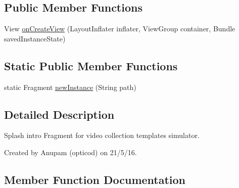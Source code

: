 \subsection*{Public Member Functions}
\begin{DoxyCompactItemize}
\item 
View \hyperlink{classorg_1_1buildmlearn_1_1toolkit_1_1videocollectiontemplate_1_1fragment_1_1SplashFragment_a0a73bd58faf388b47642aabf25cb2785}{on\+Create\+View} (Layout\+Inflater inflater, View\+Group container, Bundle saved\+Instance\+State)
\end{DoxyCompactItemize}
\subsection*{Static Public Member Functions}
\begin{DoxyCompactItemize}
\item 
static Fragment \hyperlink{classorg_1_1buildmlearn_1_1toolkit_1_1videocollectiontemplate_1_1fragment_1_1SplashFragment_aa7efefbc4670331715c505b1731fb3c9}{new\+Instance} (String path)
\end{DoxyCompactItemize}


\subsection{Detailed Description}
Splash intro Fragment for video collection template\textquotesingle{}s simulator. 

Created by Anupam (opticod) on 21/5/16. 

\subsection{Member Function Documentation}
